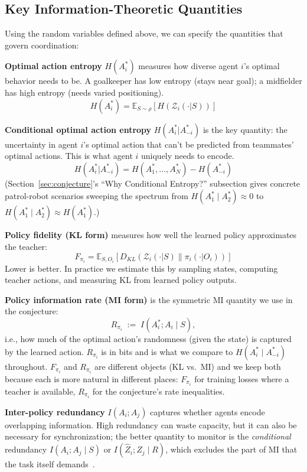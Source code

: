 \documentclass[10pt, letterpaper]{article}
\begin{document}
\subsection{Key Information-Theoretic Quantities}

Using the random variables defined above, we can specify the quantities that govern coordination:

\textbf{Optimal action entropy} $H(A_i^*)$ measures how diverse agent $i$'s optimal behavior needs to be. A goalkeeper has low entropy (stays near goal); a midfielder has high entropy (needs varied positioning).
\[H(A_i^*) = \mathbb{E}_{S \sim \rho} \left[ H(\mathcal{Z}_i(\cdot|S)) \right]\]

\textbf{Conditional optimal action entropy} $H(A_i^*|A_{-i}^*)$ is the key quantity: the uncertainty in agent $i$'s optimal action that can't be predicted from teammates' optimal actions. This is what agent $i$ uniquely needs to encode.
\[H(A_i^*|A_{-i}^*) = H(A_1^*, \ldots, A_N^*) - H(A_{-i}^*)\]
(Section~\ref{sec:conjecture}'s ``Why Conditional Entropy?'' subsection gives concrete patrol-robot scenarios sweeping the spectrum from $H(A_1^* \mid A_2^*) \approx 0$ to $H(A_1^* \mid A_2^*) \approx H(A_1^*)$.)

\textbf{Policy fidelity (KL form)} measures how well the learned policy approximates the teacher:
\[F_{\pi_i} = \mathbb{E}_{S, O_i} \left[ D_{KL}(\mathcal{Z}_i(\cdot|S) \| \pi_i(\cdot|O_i)) \right]\]
Lower is better. In practice we estimate this by sampling states, computing teacher actions, and measuring KL from learned policy outputs.

\textbf{Policy information rate (MI form)} is the symmetric MI quantity we use in the conjecture:
\[R_{\pi_i} \;:=\; I(A_i^*; A_i \mid S),\]
i.e., how much of the optimal action's randomness (given the state) is captured by the learned action. $R_{\pi_i}$ is in bits and is what we compare to $H(A_i^* \mid A_{-i}^*)$ throughout. $F_{\pi_i}$ and $R_{\pi_i}$ are different objects (KL vs.\ MI) and we keep both because each is more natural in different places: $F_{\pi_i}$ for training losses where a teacher is available, $R_{\pi_i}$ for the conjecture's rate inequalities.

\textbf{Inter-policy redundancy} $I(A_i; A_j)$ captures whether agents encode overlapping information. High redundancy can waste capacity, but it can also be necessary for synchronization; the better quantity to monitor is the \emph{conditional} redundancy $I(A_i; A_j \mid S)$ or $I(\hat{Z}_i; \hat{Z}_j \mid R)$, which excludes the part of MI that the task itself demands~\cite{li2022pmic,fischer2020ceb}.
\end{document}
